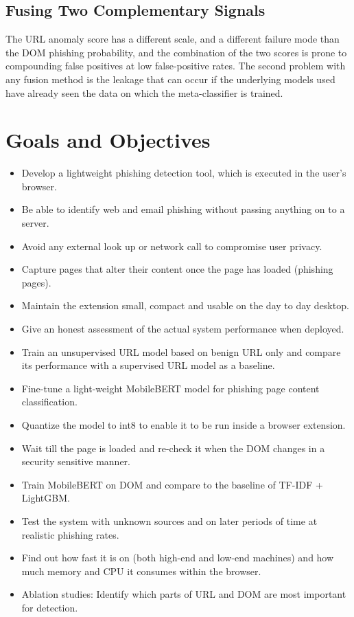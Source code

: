 \documentclass{FastFyp}
\begin{document}
\subsection{Fusing Two Complementary Signals}
The URL anomaly score has a different scale, and a different failure mode than the DOM phishing probability, and the combination of the two scores is prone to compounding false positives at low false-positive rates. The second problem with any fusion method is the leakage that can occur if the underlying models used have already seen the data on which the meta-classifier is trained.

\section{Goals and Objectives}

\begin{itemize}
    \item Develop a lightweight phishing detection tool, which is executed in the user's browser.
    \item Be able to identify web and email phishing without passing anything on to a server.
    \item Avoid any external look up or network call to compromise user privacy.
    \item Capture pages that alter their content once the page has loaded (phishing pages).
    \item Maintain the extension small, compact and usable on the day to day desktop.
    \item Give an honest assessment of the actual system performance when deployed.
    \item Train an unsupervised URL model based on benign URL only and compare its performance with a supervised URL model as a baseline.
    \item Fine-tune a light-weight MobileBERT model for phishing page content classification.
    \item Quantize the model to int8 to enable it to be run inside a browser extension.
    \item Wait till the page is loaded and re-check it when the DOM changes in a security sensitive manner.
    \item Train MobileBERT on DOM and compare to the baseline of TF-IDF + LightGBM.
    \item Test the system with unknown sources and on later periods of time at realistic phishing rates.
    \item Find out how fast it is on (both high-end and low-end machines) and how much memory and CPU it consumes within the browser.
    \item Ablation studies: Identify which parts of URL and DOM are most important for detection.
\end{itemize}
\end{document}
